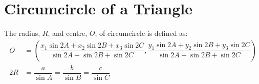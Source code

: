 \documentclass[../main.tex]{subfile}
\begin{document}
\section{Circumcircle of a Triangle}\label{circ_trig}
	The radius, $R$, and centre, $O$, of circumcircle is defined as:
	\begin{align}
		O & = \left( \dfrac{x_1 \sin 2A + x_2 \sin 2B + x_3 \sin 2C}{\sin 2A + \sin 2B + \sin 2C}, \dfrac{y_1 \sin 2A + y_2 \sin 2B + y_3 \sin 2C}{\sin 2A + \sin 2B + \sin 2C} \right)\\
		2R & = \dfrac{a}{\sin A} = \dfrac{b}{\sin B} = \dfrac{c}{\sin C}
	\end{align}
\end{document}
